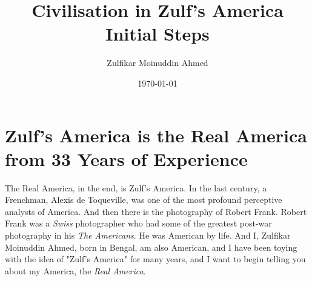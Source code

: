 \documentclass{amsart}
\title{Civilisation in Zulf's America Initial Steps}
\author{Zulfikar Moinuddin Ahmed}
\date{\today}
\begin{document}
\maketitle

\section{Zulf's America is the Real America from 33 Years of Experience}

The Real America, in the end, is Zulf's America.  In the last century, a Frenchman, Alexis de Toqueville, was one of the most profound perceptive analysts of America.  And then there is the photography of Robert Frank.  Robert Frank was a {\em Swiss} photographer who had some of the greatest post-war photography in his {\em The Americans}.  He was American by life.  And I, Zulfikar Moinuddin Ahmed, born in Bengal, am also American, and I have been toying with the idea of "Zulf's America" for many years, and I want to begin telling you about my America, the {\em Real America}.
\end{document}
